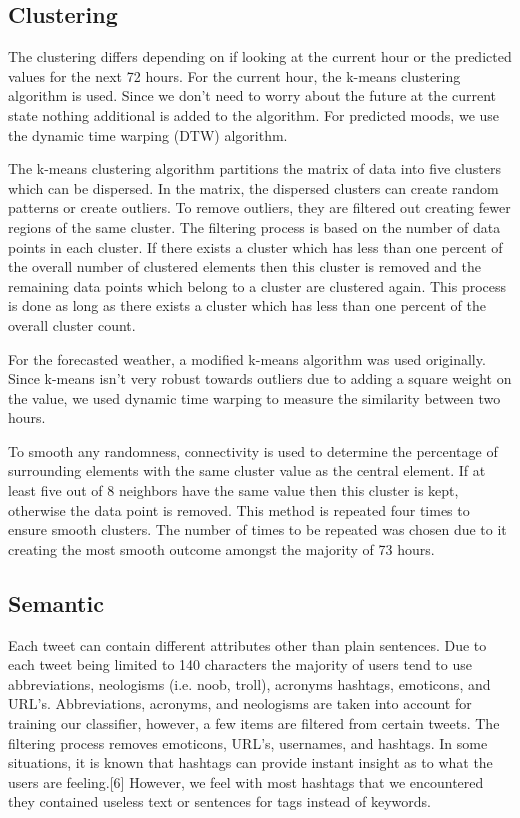 \documentclass[journal]{vgtc}                %
\begin{document}
\subsection{Clustering}
\label{sec:clust}

The clustering differs depending on if looking at the current hour or the predicted values for the next 72 hours. For the current hour, the k-means clustering algorithm is used. Since we don't need to worry about the future at the current state nothing additional is added to the algorithm. For predicted moods, we use the  dynamic time warping (DTW) algorithm.

The k-means clustering algorithm partitions the matrix of data into five clusters which can be dispersed. In the matrix, the dispersed clusters can create random patterns or create outliers. To remove outliers, they are filtered out creating fewer regions of the same cluster. The filtering process is based on the number of data points in each cluster. If there exists a cluster which has less than one percent of the overall number of clustered elements then this cluster is removed and the remaining data points which belong to a cluster are clustered again. This process is done as long as there exists a cluster which has less than one percent of the overall cluster count. 

For the forecasted weather, a modified k-means algorithm was used originally. Since k-means isn't very robust towards outliers due to adding a square weight on the value, we used dynamic time warping to measure the similarity between two hours. 

To smooth any randomness, connectivity is used to determine the percentage of surrounding elements with the same cluster value as the central element. If at least five out of 8 neighbors have the same value then this cluster is kept, otherwise the data point is removed. This method is repeated four times to ensure smooth clusters. The number of times to be repeated was chosen due to it creating the most smooth outcome amongst the majority of 73 hours.

\subsection{Semantic}
\label{sec:senti}

Each tweet can contain different attributes other than plain sentences. Due to each tweet being limited to 140 characters the majority of users tend to use abbreviations, neologisms (i.e. noob, troll), acronyms hashtags, emoticons, and URL's. Abbreviations, acronyms, and neologisms are taken into account for training our classifier, however, a few items are filtered from certain tweets. The filtering process removes  emoticons, URL's, usernames, and hashtags. In some situations, it is known that hashtags can provide instant insight as to what the users are feeling.[6] However, we feel with most hashtags that we encountered they contained useless text or sentences for tags instead of keywords.
\end{document}
